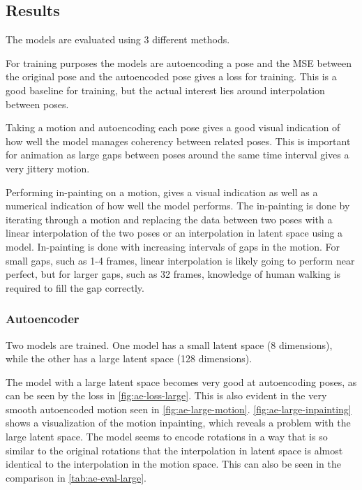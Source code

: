\subsection{Results}\label{subsec:results}
The models are evaluated using 3 different methods.

For training purposes the models are autoencoding a pose and the MSE between the original pose and the autoencoded pose gives a loss for training. This is a good baseline for training, but the actual interest lies around interpolation between poses.

Taking a motion and autoencoding each pose gives a good visual indication of how well the model manages coherency between related poses. This is important for animation as large gaps between poses around the same time interval gives a very jittery motion.

Performing in-painting on a motion, gives a visual indication as well as a numerical indication of how well the model performs. The in-painting is done by iterating through a motion and replacing the data between two poses with a linear interpolation of the two poses or an interpolation in latent space using a model. In-painting is done with increasing intervals of gaps in the motion. For small gaps, such as 1-4 frames, linear interpolation is likely going to perform near perfect, but for larger gaps, such as 32 frames, knowledge of human walking is required to fill the gap correctly.

\subsubsection{Autoencoder}\label{subsubsec:ae}
Two models are trained. One model has a small latent space (8 dimensions), while the other has a large latent space (128 dimensions).

The model with a large latent space becomes very good at autoencoding poses, as can be seen by the loss in \autoref{fig:ae-loss-large}. This is also evident in the very smooth autoencoded motion seen in \autoref{fig:ae-large-motion}. \autoref{fig:ae-large-inpainting} shows a visualization of the motion inpainting, which reveals a problem with the large latent space. The model seems to encode rotations in a way that is so similar to the original rotations that the interpolation in latent space is almost identical to the interpolation in the motion space. This can also be seen in the comparison in \autoref{tab:ae-eval-large}.


